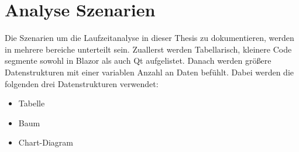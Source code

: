\section{Analyse Szenarien}
Die Szenarien um die Laufzeitanalyse in dieser Thesis zu dokumentieren, werden in mehrere
bereiche unterteilt sein. Zuallerst werden Tabellarisch, kleinere Code segmente sowohl in Blazor als
auch Qt aufgelistet. Danach werden größere Datenstrukturen mit einer variablen Anzahl an Daten
befühlt. Dabei werden die folgenden drei Datenstrukturen verwendet:

\begin{itemize}
    \item Tabelle
    \item Baum
    \item Chart-Diagram
\end{itemize}

